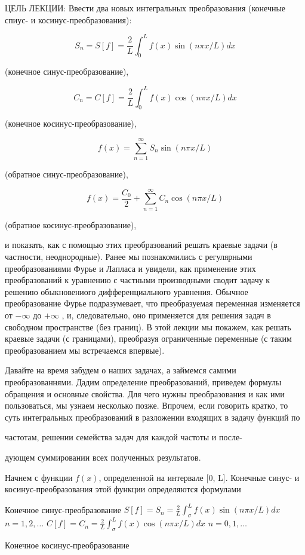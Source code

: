 \documentclass[
  ukrainian,
]{article}
\begin{document}
ЦЕЛЬ ЛЕКЦИИ: Ввести два новых интегральных преобразования (конечные
спиус- и косинус-преобразования):

\[
S_n = S[f] = \frac{2}{L} \int_0^L f(x) \sin(n\pi x/L) dx
\]

(конечное синус-преобразование),

\[
C_n = C[f] = \frac{2}{L} \int_0^L f(x) \cos(n\pi x/L) dx
\]

(конечное косинус-преобразование),

\[
f(x) = \sum_{n=1}^{\infty} S_n \sin(n\pi x/L)
\]

(обратное синус-преобразование),

\[
f(x) = \frac{C_0}{2} + \sum_{n=1}^{\infty} C_n \cos(n\pi x/L)
\]

(обратное косинус-преобразование),

и показать, как с помощью этих преобразований решать краевые задачи (в
частности, неоднородные). Ранее мы познакомились с регулярными
преобразованиями Фурье и Лапласа и увидели, как применение этих
преобразований к уравнению с частными производными сводит задачу к
решению обыкновениого дифференциального уравнения. Обычное
преобразование Фурье подразумевает, что преобразуемая переменная
изменяется от \(-\infty\) до \(+\infty\) , и, следовательно, оно
применяется для решения задач в свободном пространстве (без границ). В
этой лекции мы покажем, как решать краевые задачи (с границами),
преобразуя ограниченные переменные (с таким преобразованием мы
встречаемся впервые).

Давайте на время забудем о наших задачах, а займемся самими
преобразованнями. Дадим определение преобразований, приведем формулы
обращения и основные свойства. Для чего нужны преобразования и как ими
пользоваться, мы узнаем несколько позже. Впрочем, если говорить кратко,
то суть интегральных преобразований в разложении входящих в задачу
функций по

частотам, решении семейства задач для каждой частоты и после-

дующем суммировании всех полученных результатов.

Начнем с функции \(f(x)\), определенной на интервале {[}0, L{]}.
Конечные синус- и косинус-преобразования этой функции определяются
формулами

Конечное синус-преобразование
\(S[f] = S_n = \frac{2}{L} \int_{\sigma}^{L} f(x) \sin(n\pi x/L) dx\)
\(n = 1, 2, \dots\)
\(C[f] = C_n = \frac{2}{L} \int_{\sigma}^{L} f(x) \cos(n\pi x/L) dx\)
\(n = 0, 1, \dots\)

Конечное косинус-преобразование
\end{document}
